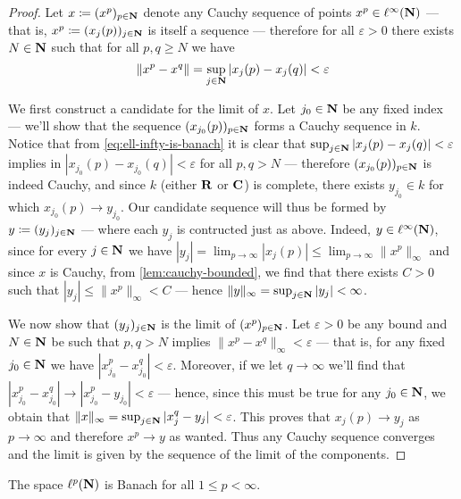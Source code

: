 \begin{proof}
Let \(x \coloneq (x^p)_{p \in \mathbf{N}}\) denote any Cauchy sequence of points \(x^p
\in \ell^{\infty}(\mathbf{N})\) --- that is, \(x^p \coloneq (x_j(p))_{j \in \mathbf{N}}\) is
itself a sequence --- therefore for all \(\varepsilon > 0\) there exists \(N \in
\mathbf{N}\) such that for all \(p, q \geq N\) we have
\begin{equation}\label{eq:ell-infty-is-banach}
\| x^p - x^q \| = \sup_{j \in \mathbf{N}} |x_j(p) - x_j(q)| < \varepsilon
\end{equation}

We first construct a candidate for the limit of \(x\). Let \(j_0 \in \mathbf{N}\) be any
fixed index --- we'll show that the sequence \((x_{j_0}(p))_{p \in \mathbf{N}}\) forms a
Cauchy sequence in \(k\). Notice that from \cref{eq:ell-infty-is-banach} it is
clear that \(\sup_{j \in \mathbf{N}} |x_j(p) - x_j(q)| < \varepsilon\) implies in
\(|x_{j_0}(p) - x_{j_0}(q)| < \varepsilon\) for all \(p, q > N\) --- therefore
\((x_{j_0}(p))_{p \in \mathbf{N}}\) is indeed Cauchy, and since \(k\) (either \(\mathbf{R}\) or
\(\mathbf{C}\)) is complete, there exists \(y_{j_0} \in k\) for which \(x_{j_0}(p) \to
y_{j_0}\). Our candidate sequence will thus be formed by \(y \coloneq (y_j)_{j
\in \mathbf{N}}\) --- where each \(y_j\) is contructed just as above. Indeed, \(y \in
\ell^{\infty}(\mathbf{N})\), since for every \(j \in \mathbf{N}\) we have \(|y_j| = \lim_{p \to
\infty} |x_j(p)| \leq \lim_{p \to \infty} \| x^p \|_{\infty}\) and since
\(x\) is Cauchy, from \cref{lem:cauchy-bounded}, we find that there exists \(C >
0\) such that \(|y_j| \leq \| x^{p} \|_{\infty} < C\) --- hence \(\| y
\|_{\infty} = \sup_{j \in \mathbf{N}} |y_j| < \infty\).

We now show that \((y_j)_{j \in \mathbf{N}}\) is the limit of \((x^p)_{p \in \mathbf{N}}\). Let
\(\varepsilon > 0\) be any bound and \(N \in \mathbf{N}\) be such that \(p, q > N\)
implies \(\| x^p - x^q \|_{\infty} < \varepsilon\) --- that is, for any fixed
\(j_0 \in \mathbf{N}\) we have \(|x_{j_0}^p - x_{j_0}^q| < \varepsilon\). Moreover, if
we let \(q \to \infty\) we'll find that \(|x_{j_0}^p - x_{j_0}^q| \to |x_{j_0}^p
- y_{j_0}| < \varepsilon\) --- hence, since this must be true for any \(j_0 \in
\mathbf{N}\), we obtain that \(\| x \|_{\infty} = \sup_{j \in \mathbf{N}} |x_j^q - y_j| <
\varepsilon\). This proves that \(x_j(p) \to y_j\) as \(p \to \infty\) and
therefore \(x^p \to y\) as wanted. Thus any Cauchy sequence converges and the
limit is given by the sequence of the limit of the components.
\end{proof}

\begin{proposition}
\label{prop:ell-p-is-banach}
The space \(\ell^p(\mathbf{N})\) is Banach for all \(1 \leq p < \infty\).
\end{proposition}

